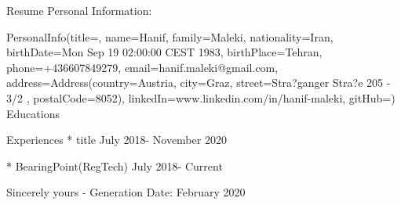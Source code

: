 Resume
Personal Information:

PersonalInfo(title=, name=Hanif, family=Maleki, nationality=Iran, birthDate=Mon Sep 19 02:00:00 CEST 1983, birthPlace=Tehran, phone=+436607849279, email=hanif.maleki@gmail.com, address=Address(country=Austria, city=Graz, street=Stra?ganger Stra?e 205 - 3/2 , postalCode=8052), linkedIn=www.linkedin.com/in/hanif-maleki, gitHub=)
Educations


Experiences
* title
July 2018- November 2020

* BearingPoint(RegTech)
July 2018- Current

Sincerely yours -
Generation Date: February 2020